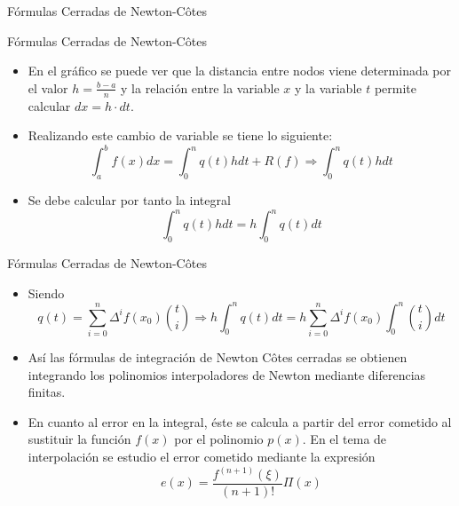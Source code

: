 \documentclass[12pt]{beamer}
\begin{document}
\begin{frame}{F\'ormulas Cerradas de Newton-C\^otes}
\begin{itemize}
\begin{center}
      \end{center}
  \end{itemize}
\end{frame}
\begin{frame}{F\'ormulas Cerradas de Newton-C\^otes}
  \begin{itemize}
    \item En el gráfico se puede ver que la distancia entre nodos viene determinada por el valor $h=\frac{b-a}{n}$ y la
    relación entre la variable $x$ y la variable $t$ permite calcular $dx = h\cdot dt$.
    \item<2-> Realizando este cambio de variable se tiene lo siguiente:
    $$
    \int_a^bf(x)dx = \int_0^nq(t)hdt+R(f) \Rightarrow \int_0^nq(t)hdt 
    $$
    \item<3-> Se debe calcular por tanto la integral
    $$
    \int_0^nq(t)hdt = h\int_{0}^{n}q(t)dt
    $$
  \end{itemize}
\end{frame}
\begin{frame}{F\'ormulas Cerradas de Newton-C\^otes}
  \begin{itemize}
    \item Siendo
    \small{
    $$
    q(t) = \sum_{i=0}^{n}\Delta^if(x_0)\binom{t}{i}\Rightarrow h\int_{0}^{n}q(t)dt = h\sum_{i=0}^{n}\Delta^if(x_0)\int_{0}^{n}\binom{t}{i}dt    
    $$}
    \item<2-> Así las fórmulas de integración de Newton C\^otes cerradas se obtienen integrando los polinomios interpoladores de Newton mediante diferencias finitas.
    \item<3-> En cuanto al error en la integral, éste se calcula a partir del error cometido al sustituir la función $f (x)$ por el polinomio $p(x)$. En el tema de interpolación se estudio el error cometido mediante la expresión
    $$
    e(x) = \dfrac{f^{(n+1)}(\xi)}{(n+1)!}\Pi(x)
    $$
  \end{itemize}
\end{frame}
\end{document}
